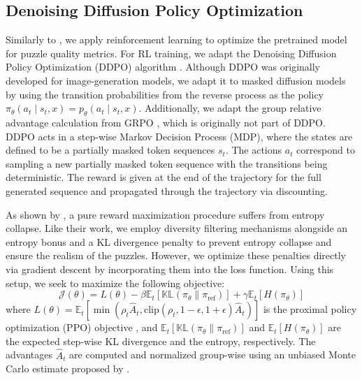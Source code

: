 \documentclass[letterpaper]{article} %
\begin{document}
\subsection{Denoising Diffusion Policy Optimization}
Similarly to \cite{feng2025generatingcreativechesspuzzles}, we apply reinforcement learning to optimize the pretrained model for puzzle quality metrics. For RL training, we adapt the Denoising Diffusion Policy Optimization (DDPO) algorithm \cite{black2024trainingdiffusionmodelsreinforcement}. Although DDPO was originally developed for image-generation models, we adapt it to masked diffusion models by using the transition probabilities from the reverse process as the policy $\pi_\theta(a_t \mid s_t, x) = p_\theta(a_t \mid s_t, x)$. Additionally, we adapt the group relative advantage calculation from GRPO \cite{shao2024deepseekmathpushinglimitsmathematical}, which is originally not part of DDPO. DDPO acts in a step-wise Markov Decision Process (MDP), where the states are defined to be a partially masked token sequences $s_t$. The actions $a_t$ correspond to sampling a new partially masked token sequence with the transitions being deterministic. The reward is given at the end of the trajectory for the full generated sequence and propagated through the trajectory via discounting.

As shown by \cite{feng2025generatingcreativechesspuzzles}, a pure reward maximization procedure suffers from entropy collapse. Like their work, we employ diversity filtering mechanisms alongside an entropy bonus and a KL divergence penalty to prevent entropy collapse and ensure the realism of the puzzles. However, we optimize these penalties directly via gradient descent by incorporating them into the loss function. Using this setup, we seek to maximize the following objective:
\begin{equation}
    \mathcal{J}(\theta) = L(\theta) - \beta \mathbb{E}_t\left[\mathbb{KL}(\pi_\theta \parallel \pi_{\text{ref}})\right] + \gamma \mathbb{E}_t\left[H(\pi_\theta)\right]
\end{equation}
where $L(\theta) = \mathbb{E}_t [ \min(\rho_t \hat{A}_t, \text{clip}(\rho_t, 1-\epsilon, 1+\epsilon)\hat{A}_t) ]$ is the proximal policy optimization (PPO) objective \cite{schulman2017proximalpolicyoptimizationalgorithms}, and $\mathbb{E}_t\left[\mathbb{KL}(\pi_\theta \parallel \pi_{\text{ref}})\right]$ and $\mathbb{E}_t\left[H(\pi_\theta)\right]$ are the expected step-wise KL divergence and the entropy, respectively. The advantages $\hat{A}_t$ are computed and normalized group-wise using an unbiased Monte Carlo estimate proposed by \cite{kool2019unbiasedbaseline}.
\end{document}
